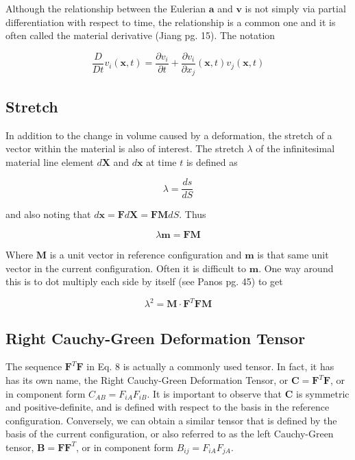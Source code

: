 \documentclass[a4paper]{article}
\begin{document}
Although the relationship between the Eulerian $\mathbf{a}$ and $\mathbf{v}$ is not simply via partial differentiation with respect to time, the relationship is a common one and it is often called the material derivative (Jiang pg. 15). The notation

\begin{equation}
    \frac{D}{Dt}v_i(\mathbf{x},t) = \frac{\partial v_i}{\partial t} + \frac{\partial v_i}{\partial x_j}(\mathbf{x},t) v_j(\mathbf{x},t)
\end{equation}

\subsection{Stretch}
In addition to the change in volume caused by a deformation, the stretch of a vector within the material is also of interest. The stretch $\lambda$ of the infinitesimal material line element $d\mathbf{X}$ and $d\mathbf{x}$ at time $t$ is defined as 

\begin{equation}
    \lambda = \frac{ds}{dS}
\end{equation}

and also noting that $d\mathbf{x} = \mathbf{F}d\mathbf{X} = \mathbf{F} \mathbf{M} dS$. Thus

\begin{equation}
    \lambda \mathbf{m} = \mathbf{F} \mathbf{M}
\end{equation}

Where $\mathbf{M}$ is a unit vector in reference configuration and $\mathbf{m}$ is that same unit vector in the current configuration. Often it is difficult to $\mathbf{m}$. One way around this is to dot multiply each side by itself (see Panos pg. 45) to get 

\begin{equation}
    \lambda^2 = \mathbf{M} \cdot \mathbf{F}^T \mathbf{F} \mathbf{M}
\end{equation}

\subsection{Right Cauchy-Green Deformation Tensor}
The sequence $\mathbf{F}^T \mathbf{F}$ in Eq. 8 is actually a commonly used tensor. In fact, it has has its own name, the Right Cauchy-Green Deformation Tensor, or $\mathbf{C} = \mathbf{F}^T \mathbf{F}$, or in component form $C_{AB} = F_{iA}F_{iB}$. It is important to observe that $\mathbf{C}$ is  symmetric and positive-definite, and is defined with respect to the basis in the reference configuration. Conversely, we can obtain a similar tensor that is defined by the basis of the current configuration, or also referred to as the left Cauchy-Green tensor, $\mathbf{B} = \mathbf{F}\mathbf{F}^T$, or in component form $B_{ij} = F_{iA}F_{jA}$.  
\end{document}
